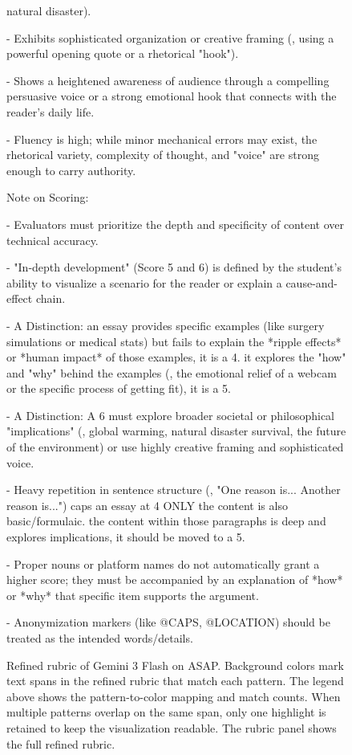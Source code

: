 \begin{figure}[t]
\begin{tcolorbox}[colback=white,colframe=black!25,title=Refined Rubric (Pattern-Highlighted),fonttitle=\bfseries\small,fontupper=\scriptsize]
natural disaster).\par - Exhibits sophisticated organization or creative framing (, using a powerful opening quote or a rhetorical "hook").\par - Shows a heightened awareness of audience through a compelling persuasive voice or a strong emotional hook that connects with the reader's daily life.\par - Fluency is high; while minor mechanical errors may exist, the rhetorical variety, complexity of thought, and "voice" are strong enough to carry authority.\par \par Note on Scoring: \par - Evaluators must prioritize the depth and specificity of content over technical accuracy.\par - "In-depth development" (Score 5 and 6) is defined by the student's ability to visualize a scenario for the reader or explain a cause-and-effect chain.\par - A  Distinction:  an essay provides specific examples (like surgery simulations or medical stats) but fails to explain the *ripple effects* or *human impact* of those examples, it is a 4.  it explores the "how" and "why" behind the examples (, the emotional relief of a webcam or the specific process of getting fit), it is a 5.\par - A  Distinction: A 6 must explore broader societal or philosophical "implications" (, global warming, natural disaster survival, the future of the environment) or use highly creative framing and sophisticated voice.\par - Heavy repetition in sentence structure (, "One reason is... Another reason is...") caps an essay at 4 ONLY  the content is also basic/formulaic.  the content within those paragraphs is deep and explores implications, it should be moved to a 5.\par - Proper nouns or platform names do not automatically grant a higher score; they must be accompanied by an explanation of *how* or *why* that specific item supports the argument.\par - Anonymization markers (like @CAPS, @LOCATION) should be treated as the intended words/details.
\end{tcolorbox}
\caption{Refined rubric of Gemini 3 Flash on ASAP. Background colors mark text spans in the refined rubric that match each pattern. The legend above shows the pattern-to-color mapping and match counts. When multiple patterns overlap on the same span, only one highlight is retained to keep the visualization readable. The rubric panel shows the full refined rubric.}
\label{fig:rubric_pattern_bg_asap_1_google_gemini_3_flash_preview_base_expert_True_train100_iteration5_top3_bs4_8_12_mc4}
\end{figure}
